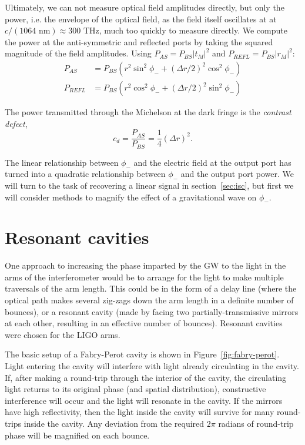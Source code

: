 Ultimately, we can not measure optical field amplitudes directly, but
only the power, i.e. the envelope of the optical field, as the field
itself oscillates at at $c/(1064\text{ nm})\approx 300\text{ THz}$,
much too quickly to measure directly.  We compute the power at the
anti-symmetric and reflected ports by taking the squared magnitude of
the field amplitudes.  Using $P_{AS} = P_{BS} \left|t_M\right|^2$ and
$P_{REFL} = P_{BS} \left|r_M\right|^2$:
%
\begin{align}
P_{AS}   &=  P_{BS}\left( {r}^2 \sin^2 \phi_- + (\Delta r/2)^2 \cos^2 \phi_-\right) \\
P_{REFL} &=  P_{BS}\left( {r}^2 \cos^2 \phi_- + (\Delta r/2)^2 \sin^2 \phi_-\right) 
\end{align}

The power transmitted through the Michelson at the dark fringe is the
\emph{contrast defect},
%
\begin{equation}
c_d = \frac{P_{AS}}{P_{BS}} = \frac{1}{4}\left(\Delta r\right)^2.
\end{equation}

The linear relationship between $\phi_-$ and the electric field at the
output port has turned into a quadratic relationship between $\phi_-$
and the output port power.  We will turn to the task of recovering a
linear signal in section~\ref{sec:isc}, but first we will consider
methods to magnify the effect of a gravitational wave on $\phi_-$.

\section{Resonant cavities}

One approach to increasing the phase imparted by the GW to the light
in the arms of the interferometer would be to arrange for the light to
make multiple traversals of the arm length.  This could be in the form
of a delay line (where the optical path makes several zig-zags down
the arm length in a definite number of bounces), or a resonant cavity
(made by facing two partially-transmissive mirrors at each other,
resulting in an effective number of bounces).  Resonant cavities were
chosen for the LIGO arms. 

The basic setup of a Fabry-Perot cavity is shown in Figure~\ref{fig:fabry-perot}.
Light entering the cavity will interfere with light already
circulating in the cavity.  If, after making a round-trip through the
interior of the cavity, the circulating light returns to its original
phase (and spatial distribution), constructive interference will occur
and the light will resonate in the cavity.  If the mirrors have high
reflectivity, then the light inside the cavity will survive for many
round-trips inside the cavity. Any deviation from the required $2\pi$
radians of round-trip phase will be magnified on each bounce.

